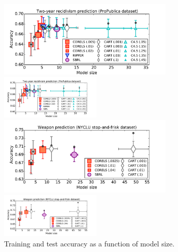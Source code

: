 \begin{figure}[t!]
\begin{center}
\begin{arxiv}
\includegraphics[trim={12mm, 0mm, 24mm, 5mm},
width=0.75\textwidth]{figs/compas-sparsity-training.pdf}
\end{arxiv}
\begin{kdd}
\includegraphics[trim={12mm, 0mm, 24mm, 5mm}, width=0.43\textwidth]{figs/compas-sparsity-training.pdf}
\end{kdd}
\begin{arxiv}
\includegraphics[trim={12mm, 5mm, 24mm, 1mm},
width=0.75\textwidth]{figs/frisk-sparsity-training.pdf}
\end{arxiv}
\begin{kdd}
\includegraphics[trim={12mm, 12mm, 24mm, 1mm}, width=0.43\textwidth]{figs/frisk-sparsity-training.pdf}
\end{kdd}
\end{center}
\caption{Training and test accuracy as a function of model size.
}
\end{figure}

